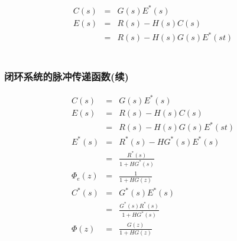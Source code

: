 \documentclass[table]{beamer}
\begin{document}
\begin{frame}
\begin{columns}
\begin{column}{0.5\textwidth}
\begin{block}
\begin{eqnarray*}
C(s) &=& G(s)E^*(s) \\
E(s) &=& R(s)-H(s)C(s) \\
     &=& R(s)-H(s)G(s)E^*(st) \\
\end{eqnarray*}
\end{block}
\end{column}
\end{columns}
\end{frame}
\begin{frame}
\frametitle{闭环系统的脉冲传递函数(续)}
\label{sec-4-2}

\begin{eqnarray*}
C(s) &=& G(s)E^*(s) \\
E(s) &=& R(s)-H(s)C(s) \\
 &=& R(s)-H(s)G(s)E^*(st) \\
E^*(s) &=& R^*(s)-HG^*(s)E^*(s)\\
  &=& \frac{R^*(s)}{1+HG^*(s)} \\
\Phi_e(z) &=& \frac{1}{1+HG(z)} \\
C^*(s) &=& G^*(s)E^*(s)\\
 &=& \frac{G^*(s)R^*(s)}{1+HG^*(s)} \\
\Phi(z) &=& \frac{G(z)}{1+HG(z)} 
\end{eqnarray*}
\end{frame}
\end{document}
